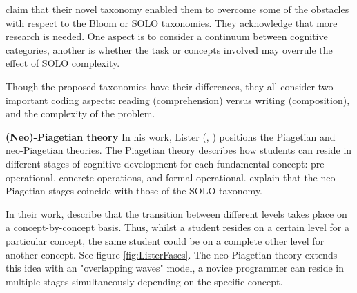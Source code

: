  claim that their novel taxonomy enabled them to overcome some of the obstacles with respect to the Bloom or SOLO taxonomies. They acknowledge that more research is needed. One aspect is to consider a continuum between cognitive categories, another is whether the task or concepts involved may overrule the effect of SOLO complexity.



Though the proposed taxonomies have their differences, they all consider two important coding aspects: reading (comprehension) versus writing (composition), and the complexity of the problem.
%
%

\noindent \textbf{(Neo)-Piagetian theory}\newline
In his work, Lister (\citeyear{lister2010naturally}, \citeyear{lister2016toward}) positions the Piagetian and neo-Piagetian theories. The Piagetian theory describes how students can reside in different stages of cognitive development for each fundamental concept: pre-operational, concrete operations, and formal operational.  explain that the neo-Piagetian stages coincide with those of the SOLO taxonomy. 

In their work,  describe that the transition between different levels takes place on a concept-by-concept basis. Thus, whilst a student resides on a certain level for a particular concept, the same student could be on a complete other level for another concept. See figure \ref{fig:ListerFases}. The neo-Piagetian theory extends this idea with an "overlapping waves" model, a novice programmer can reside in multiple stages simultaneously depending on the specific concept.


